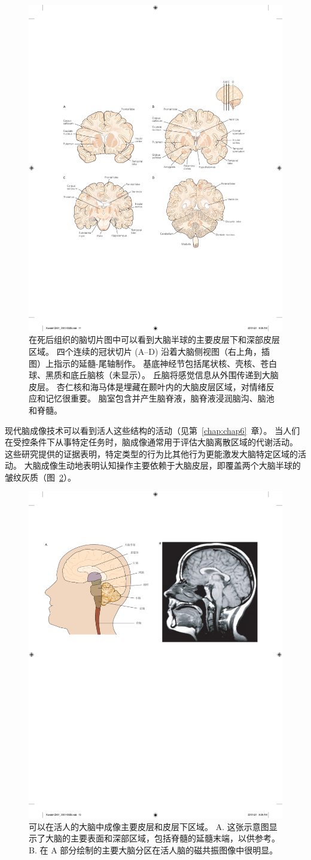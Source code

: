 \begin{figure}[htbp]
	\centering
	\includegraphics[width=0.5\linewidth]{chap01/fig_1_4}
	\caption{在死后组织的脑切片图中可以看到大脑半球的主要皮层下和深部皮层区域。
		四个连续的冠状切片 (A–D) 沿着大脑侧视图（右上角，插图）上指示的延髓-尾轴制作。
		基底神经节包括尾状核、壳核、苍白球、黑质和底丘脑核（未显示）。
		丘脑将感觉信息从外围传递到大脑皮层。
		杏仁核和海马体是埋藏在颞叶内的大脑皮层区域，对情绪反应和记忆很重要。
		脑室包含并产生脑脊液，脑脊液浸润脑沟、脑池和脊髓\cite{nieuwenhuys2007human}。}
	\label{fig:1_4}
\end{figure}


现代脑成像技术可以看到活人这些结构的活动（见第~\ref{chap:chap6}~章）。
当人们在受控条件下从事特定任务时，脑成像通常用于评估大脑离散区域的代谢活动。
这些研究提供的证据表明，特定类型的行为比其他行为更能激发大脑特定区域的活动。
大脑成像生动地表明认知操作主要依赖于大脑皮层，即覆盖两个大脑半球的皱纹灰质（图~\ref{fig:1_5}）。


\begin{figure}[htbp]
	\centering
	\includegraphics[width=0.5\linewidth]{chap01/fig_1_5}
	\caption{可以在活人的大脑中成像主要皮层和皮层下区域。
		A. 这张示意图显示了大脑的主要表面和深部区域，包括脊髓的延髓末端，以供参考。
		B. 在 A 部分绘制的主要大脑分区在活人脑的磁共振图像中很明显。}
	\label{fig:1_5}
\end{figure}


